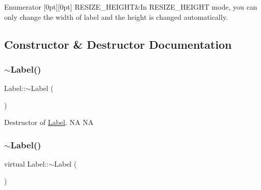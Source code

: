 \begin{DoxyEnumFields}{Enumerator}
[0pt][0pt]{}\mbox{\label{classLabel_af7d31998ea743e8ca64eb1a983fa6a4ca25ddd126af75d0a6b8e195603cad17eb}} 
R\+E\+S\+I\+Z\+E\+\_\+\+H\+E\+I\+G\+HT&In R\+E\+S\+I\+Z\+E\+\_\+\+H\+E\+I\+G\+HT mode, you can only change the width of label and the height is changed automatically. \\
\hline

\end{DoxyEnumFields}


\subsection{Constructor \& Destructor Documentation}
\mbox{\label{classLabel_a39e1167a9b5827afd888780973d88894}} 
\subsubsection{\texorpdfstring{$\sim$\+Label()}{~Label()}\hspace{0.1cm}{\footnotesize\ttfamily [1/2]}}
{\footnotesize\ttfamily Label\+::$\sim$\+Label (\begin{DoxyParamCaption}{ }\end{DoxyParamCaption})\hspace{0.3cm}{\ttfamily [virtual]}}

Destructor of \hyperlink{classLabel}{Label}.  NA  NA \mbox{\label{classLabel_ae0405d591a2ff63c03b104435e2a3066}} 
\subsubsection{\texorpdfstring{$\sim$\+Label()}{~Label()}\hspace{0.1cm}{\footnotesize\ttfamily [2/2]}}
{\footnotesize\ttfamily virtual Label\+::$\sim$\+Label (\begin{DoxyParamCaption}{ }\end{DoxyParamCaption})\hspace{0.3cm}{\ttfamily [virtual]}}

